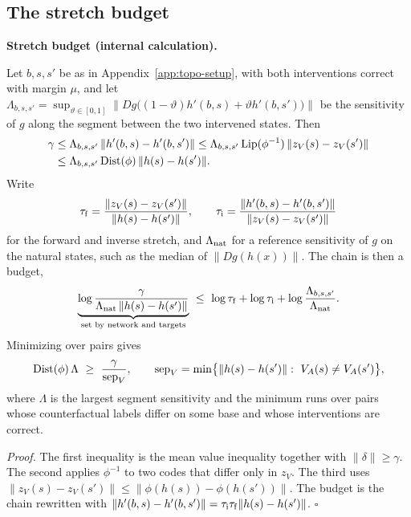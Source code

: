 \documentclass[11pt,a4paper]{article}
\newenvironment{keybox}[1]{%
  \def\FrameCommand{{\color{ccalc}\vrule width 1.6pt}\hspace{8pt}}%
  \MakeFramed{\advance\hsize-\width\FrameRestore}%
  \noindent\textbf{#1}\par\smallskip\noindent\ignorespaces}{\endMakeFramed}
\begin{document}
\subsection{The stretch budget}
\label{app:topo-stretch}

\begin{keybox}{Stretch budget (internal calculation).}
Let $b,s,s'$ be as in Appendix~\ref{app:topo-setup}, with both interventions
correct with margin $\mu$, and let
$\Lambda_{b,s,s'}=\sup_{\vartheta\in[0,1]}\bigl\|Dg\bigl((1-\vartheta)h'(b,s)+\vartheta h'(b,s')\bigr)\bigr\|$
be the sensitivity of $g$ along the segment between the two intervened
states. Then
\begin{equation}
\begin{aligned}
\gamma&\le\Lambda_{b,s,s'}\,\|h'(b,s)-h'(b,s')\|
\le\Lambda_{b,s,s'}\operatorname{Lip}(\phi^{-1})\,\|z_V(s)-z_V(s')\|\\
&\le\Lambda_{b,s,s'}\operatorname{Dist}(\phi)\,\|h(s)-h(s')\| .
\end{aligned}
\label{eq:topo-chain}
\end{equation}
Write
\[
\tau_{\rm f}=\frac{\|z_V(s)-z_V(s')\|}{\|h(s)-h(s')\|},\qquad
\tau_{\rm i}=\frac{\|h'(b,s)-h'(b,s')\|}{\|z_V(s)-z_V(s')\|}
\]
for the forward and inverse stretch, and $\Lambda_{\rm nat}$ for a reference
sensitivity of $g$ on the natural states, such as the median of
$\|Dg(h(x))\|$. The chain is then a budget,
\begin{equation}
\underbrace{\log\frac{\gamma}{\Lambda_{\rm nat}\,\|h(s)-h(s')\|}}_{\text{set by network and targets}}
\ \le\ \log\tau_{\rm f}+\log\tau_{\rm i}+\log\frac{\Lambda_{b,s,s'}}{\Lambda_{\rm nat}} .
\label{eq:topo-budget}
\end{equation}
Minimizing over pairs gives
\begin{equation}
\Dist(\phi)\,\Lambda\ \ge\ \frac{\gamma}{\sep_V},\qquad
\sep_V=\min\bigl\{\|h(s)-h(s')\|:\ V_A(s)\neq V_A(s')\bigr\},
\label{eq:topo-sep}
\end{equation}
where $\Lambda$ is the largest segment sensitivity and the minimum runs over
pairs whose counterfactual labels differ on some base and whose interventions
are correct.
\end{keybox}

\noindent\emph{Proof.} The first inequality is the mean value inequality
together with $\|\delta\|\ge\gamma$. The second applies $\phi^{-1}$ to two
codes that differ only in $z_V$. The third uses
$\|z_V(s)-z_V(s')\|\le\|\phi(h(s))-\phi(h(s'))\|$. The budget is the chain
rewritten with
$\|h'(b,s)-h'(b,s')\|=\tau_{\rm i}\tau_{\rm f}\|h(s)-h(s')\|$. $\square$
\end{document}
